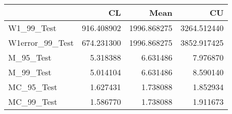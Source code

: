 \begin{tabular}{lrrr}
\toprule
{} &          CL &         Mean &           CU \\
\midrule
W1\_99\_Test      &  916.408902 &  1996.868275 &  3264.512440 \\
W1error\_99\_Test &  674.231300 &  1996.868275 &  3852.917425 \\
M\_95\_Test       &    5.318388 &     6.631486 &     7.976870 \\
M\_99\_Test       &    5.014104 &     6.631486 &     8.590140 \\
MC\_95\_Test      &    1.627431 &     1.738088 &     1.852934 \\
MC\_99\_Test      &    1.586770 &     1.738088 &     1.911673 \\
\bottomrule
\end{tabular}
